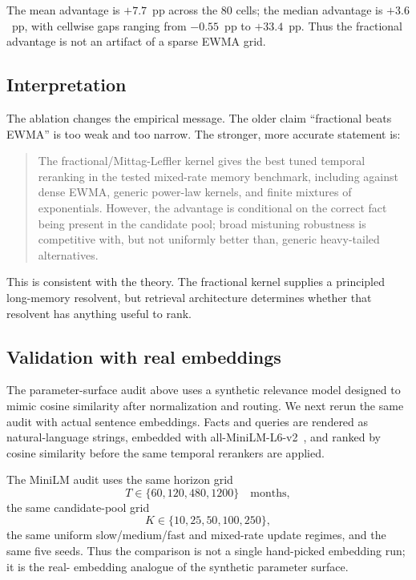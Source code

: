 \documentclass[11pt]{article}
\theoremstyle{plain}
\theoremstyle{definition}
\begin{document}
The mean advantage is $+7.7$~pp across the $80$ cells;
the median advantage is $+3.6$~pp, with cellwise gaps
ranging from $-0.55$~pp to $+33.4$~pp.  Thus the
fractional advantage is not an artifact of a sparse EWMA
grid.

\subsection{Interpretation}

The ablation changes the empirical message.  The older
claim ``fractional beats EWMA'' is too weak and too
narrow.  The stronger, more accurate statement is:
\begin{quote}
The fractional/Mittag-Leffler kernel gives the best
tuned temporal reranking in the tested mixed-rate memory
benchmark, including against dense EWMA, generic
power-law kernels, and finite mixtures of exponentials.
However, the advantage is conditional on the correct fact
being present in the candidate pool; broad mistuning
robustness is competitive with, but not uniformly better
than, generic heavy-tailed alternatives.
\end{quote}
This is consistent with the theory.  The fractional
kernel supplies a principled long-memory resolvent, but
retrieval architecture determines whether that resolvent
has anything useful to rank.


\subsection{Validation with real embeddings}
\label{sec:real_embeddings}

The parameter-surface audit above uses a synthetic
relevance model designed to mimic cosine similarity after
normalization and routing.  We next rerun the same audit
with actual sentence embeddings.  Facts and queries are
rendered as natural-language strings, embedded with
all-MiniLM-L6-v2~\cite{wang2020minilm}, and ranked by
cosine similarity before the same temporal rerankers are
applied.

The MiniLM audit uses the same horizon grid
\[
T\in\{60,120,480,1200\}\quad\text{months},
\]
the same candidate-pool grid
\[
K\in\{10,25,50,100,250\},
\]
the same uniform slow/medium/fast and mixed-rate update
regimes, and the same five seeds.  Thus the comparison is
not a single hand-picked embedding run; it is the real-
embedding analogue of the synthetic parameter surface.
\end{document}
